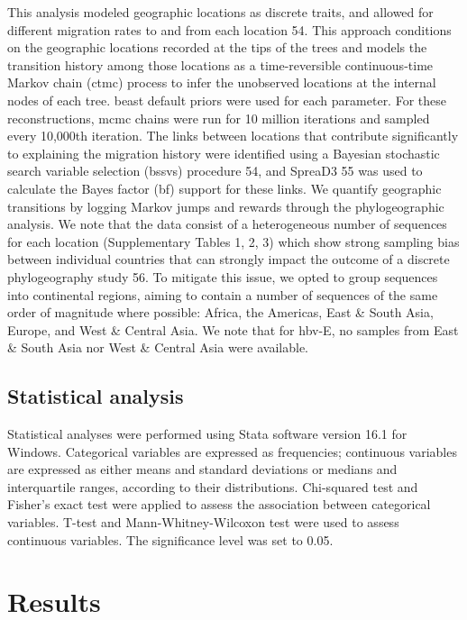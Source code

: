 This analysis modeled geographic locations as discrete traits, and allowed for different migration rates to and from each location 54.
This approach conditions on the geographic locations recorded at the tips of the trees and models the transition history among those locations as a time-reversible continuous-time Markov chain (\gls{ctmc}) process to infer the unobserved locations at the internal nodes of each tree.
\gls{beast} default priors were used for each parameter.
For these reconstructions, \gls{mcmc} chains were run for 10 million iterations and sampled every 10,000th iteration.
The links between locations that contribute significantly to explaining the migration history were identified using a Bayesian stochastic search variable selection (\gls{bssvs}) procedure 54, and SpreaD3 55 was used to calculate the Bayes factor (\gls{bf}) support for these links.
We quantify geographic transitions by logging Markov jumps and rewards through the phylogeographic analysis.
We note that the data consist of a heterogeneous number of sequences for each location (Supplementary Tables 1, 2, 3) which show strong sampling bias between individual countries that can strongly impact the outcome of a discrete phylogeography study 56.
To mitigate this issue, we opted to group sequences into continental regions, aiming to contain a number of sequences of the same order of magnitude where possible: Africa, the Americas, East \& South Asia, Europe, and West \& Central Asia.
We note that for \gls{hbv}-E, no samples from East \& South Asia nor West \& Central Asia were available.

\subsection{Statistical analysis}
Statistical analyses were performed using Stata software version 16.1 for Windows.
Categorical variables are expressed as frequencies; continuous variables are expressed as either means and standard deviations or medians and interquartile ranges, according to their distributions.
Chi-squared test and Fisher's exact test were applied to assess the association between categorical variables.
T-test and Mann-Whitney-Wilcoxon test were used to assess continuous variables.
The significance level was set to 0.05.


\section{Results}
